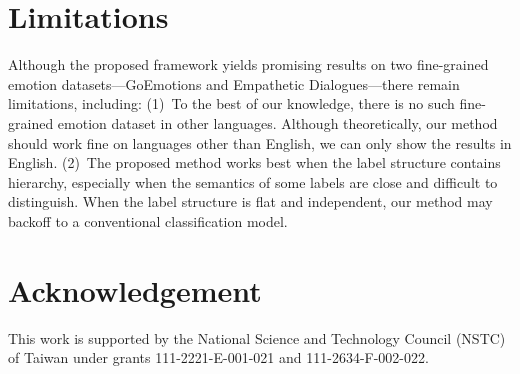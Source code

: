 \section*{Limitations}
Although the proposed framework yields promising results on two fine-grained
emotion datasets---GoEmotions and Empathetic Dialogues---there remain
limitations, including:
(1)~To the best of our knowledge, there is no such fine-grained emotion
dataset in other languages. Although theoretically, our method should work fine on
languages other than English, we can only show the results in English.
(2)~The proposed method works best when the label structure contains
hierarchy, especially when the semantics of some labels are close and difficult to
distinguish. When the label structure is flat and independent, our method may
backoff to a conventional classification model.

\section*{Acknowledgement}
This work is supported by the National Science and Technology Council (NSTC) of Taiwan under grants 111-2221-E-001-021 and 111-2634-F-002-022.
